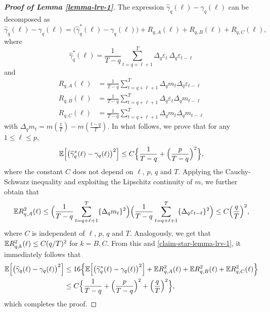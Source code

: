 \begin{proof}[\textnormal{\textbf{Proof of Lemma \ref{lemma-lrv-1}}}] 
The expression $\widehat{\gamma}_q(\ell) - \gamma_q(\ell)$ can be decomposed as
\[ \widehat{\gamma}_q(\ell) - \gamma_q(\ell) = \big(\widehat{\gamma}_q^*(\ell) - \gamma_q(\ell)\big) + R_{q,A}(\ell) + R_{q,B}(\ell) + R_{q,C}(\ell), \] 
where
\[ \widehat{\gamma}_q^*(\ell) = \frac{1}{T-q} \sum\limits_{t=q+\ell+1}^T \Delta_q \varepsilon_t \, \Delta_q \varepsilon_{t-\ell} \] 
and
\begin{align*} 
R_{q,A}(\ell) & = \frac{1}{T-q} \sum_{t=q+\ell+1}^T \Delta_q m_t \Delta_q \varepsilon_{t-\ell} \\
R_{q,B}(\ell) & = \frac{1}{T-q} \sum_{t=q+\ell+1}^T \Delta_q \varepsilon_t \Delta_q m_{t-\ell} \\
R_{q,C}(\ell) & = \frac{1}{T-q} \sum_{t=q+\ell+1}^T \Delta_q m_t \Delta_q m_{t-\ell} 
\end{align*}
with $\Delta_q m_t = m(\frac{t}{T}) - m(\frac{t-q}{T})$. In what follows, we prove that for any $1 \le \ell \le p$,   
\begin{equation}\label{claim-star-lemma-lrv-1}
\mathbb{E} \Big[ \big( \widehat{\gamma}_q^*(\ell) - \gamma_q(\ell) \big)^2 \Big] \le C \Big\{ \frac{1}{T-q} + \Big(\frac{p}{T-q}\Big)^2 \Big\}, 
\end{equation}
where the constant $C$ does not depend on $\ell$, $p$, $q$ and $T$. Applying the Cauchy-Schwarz inequality and exploiting the Lipschitz continuity of $m$, we further obtain that 
\[ \mathbb{E} R_{q,A}^2(\ell) \le  \Big( \frac{1}{T-q} \sum_{t=q+\ell+1}^T \{ \Delta_q m_t \}^2 \Big) \Big( \frac{1}{T-q} \sum_{t=q+\ell+1}^T \{ \Delta_q \varepsilon_{t-\ell} \}^2 \Big) \le C \Big( \frac{q}{T} \Big)^2, \]
where $C$ is independent of $\ell$, $p$, $q$ and $T$. Analogously, we get that $\mathbb{E} R_{q,k}^2(\ell) \le C (q/T)^2$ for $k = B,C$. From this and \eqref{claim-star-lemma-lrv-1}, it immediately follows that
\begin{align*}
\mathbb{E} \Big[ \big( \widehat{\gamma}_q(\ell) - \gamma_q(\ell) \big)^2 \Big] 
 & \le 16 \Big\{ \mathbb{E} \Big[ \big( \widehat{\gamma}_q^*(\ell) - \gamma_q(\ell) \big)^2 \Big] + \mathbb{E} R_{q,A}^2(\ell) + \mathbb{E} R_{q,B}^2(\ell) + \mathbb{E} R_{q,C}^2(\ell) \Big\} \\
 & \le C \Big\{ \frac{1}{T-q} + \Big(\frac{p}{T-q}\Big)^2 + \Big(\frac{q}{T}\Big)^2 \Big\},
\end{align*}
which completes the proof. 



\end{proof}
